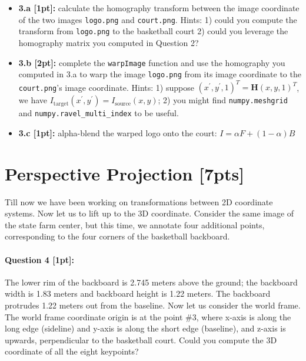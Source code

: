 \documentclass[11pt]{article}
\begin{document}
\begin{itemize}
\item \textbf{3.a [1pt]:} calculate the homography transform between the image coordinate of the two images \texttt{logo.png} and \texttt{court.png}. Hints: 1) could you compute the transform from \texttt{logo.png} to the basketball court 2) could you leverage the homography matrix you computed in Question 2? 
\item \textbf{3.b [2pt]:} complete the \texttt{warpImage} function and use the homography you computed in 3.a to warp the image \texttt{logo.png} from its image coordinate to the \texttt{court.png}'s image coordinate. Hints: 1) suppose $(x^\prime, y^\prime, 1)^T = \mathbf{H} (x, y, 1)^T$, we have $I_\mathrm{target}(x^\prime, y^\prime) = I_\mathrm{source}(x, y)$; 2) you might find \texttt{numpy.meshgrid} and \texttt{numpy.ravel\_multi\_index} to be useful. 
\item \textbf{3.c [1pt]:} alpha-blend the warped logo onto the court: $I = \alpha F + (1 - \alpha) B$
\end{itemize}



\section*{Perspective Projection [7pts]}
Till now we have been working on transformations between 2D coordinate systems. Now let us to lift up to the 3D coordinate. Consider the same image of the state farm center, but this time, we annotate four additional points, corresponding to the four corners of the basketball backboard. 

\paragraph{Question 4 [1pt]:} 
The lower rim of the backboard is 2.745 meters above the ground; the backboard width is 1.83 meters and backboard height is 1.22 meters. The backboard protrudes 1.22 meters out from the baseline. Now let us consider the world frame. The world frame coordinate origin is at the point \#3, where x-axis is along the long edge (sideline) and y-axis is along the short edge (baseline), and z-axis is upwards, perpendicular to the basketball court.   Could you compute the 3D coordinate of all the eight keypoints?
\end{document}
